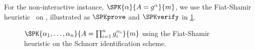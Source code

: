
For the non-interactive instance, \(\SPK{\alpha}{A = g^\alpha}{m}\), we use the 
Fiat-Shamir heuristic~\cite{FiatShamirHeuristic} on \Schn, illustrated as 
\(\SPKprove\) and \(\SPKverify\) in \cref{SPKalgorithms}.

\begin{figure*}
  \begin{minipage}[t]{0.49\linewidth}
    \begin{algorithmic}
        \EndFor{}
      \EndFunction{}
    \end{algorithmic}
  \end{minipage}
  \hfill
  \begin{minipage}[t]{0.49\linewidth}
    \begin{algorithmic}
        \Else{}
        \EndIf{}
      \EndFunction{}
    \end{algorithmic}
  \end{minipage}
  \caption{%
    \(\SPK{\alpha_1, \dotsc, \alpha_n}{A = \prod_{i=1}^n g_i^{\alpha_i}}{m}\) 
    using the Fiat-Shamir heuristic on the Schnorr identification scheme.
  }%
  \label{SPKalgorithms}
\end{figure*}

